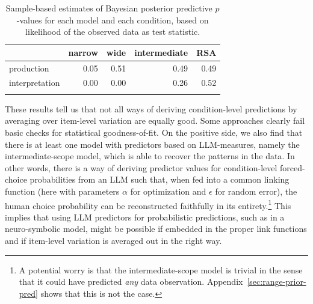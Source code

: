 \documentclass[fleqn]{article}
\begin{document}
\begin{table}[ht]
\centering


\begin{tabular}{lrrrr}
  \toprule
  & narrow & wide & intermediate & RSA \\ \midrule
  production & 0.05 & 0.51 & 0.49 & 0.49 \\
  interpretation & 0.00 & 0.00 & 0.26 & 0.52 \\ \bottomrule \\
\end{tabular}


\caption{Sample-based estimates of Bayesian posterior predictive $p$-values for each model and each condition, based on likelihood of the observed data as test statistic.}
\label{tab:Bppp-values}
\end{table}

These results tell us that not all ways of deriving condition-level predictions by averaging over item-level variation are equally good.
Some approaches clearly fail basic checks for statistical goodness-of-fit.
On the positive side, we also find that there is at least one model with predictors based on LLM-measures, namely the intermediate-scope model, which is able to recover the patterns in the data.
In other words, there is a way of deriving predictor values for condition-level forced-choice probabilities from an LLM such that, when fed into a common linking function (here with parameters $\alpha$ for optimization and $\epsilon$ for random error), the human choice probability can be reconstructed faithfully in its entirety.\footnote{
  A potential worry is that the intermediate-scope model is trivial in the sense that it could have predicted \emph{any} data observation.
  Appendix~\ref{sec:range-prior-pred} shows that this is not the case.
}
This implies that using LLM predictors for probabilistic predictions, such as in a neuro-symbolic model, might be possible if embedded in the proper link functions and if item-level variation is averaged out in the right way.
\end{document}
